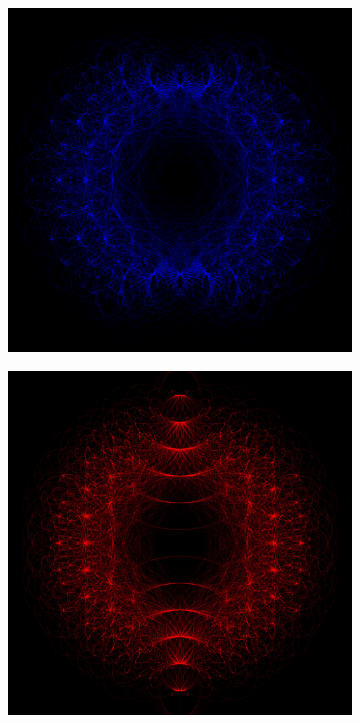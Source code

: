 \documentclass[a4paper,headsepline=3pt,headinclude=true,12pt,oneside]{scrartcl}
\begin{document}
\begin{onehalfspace}
	\begin{figure}[h]
		\begin{subfigure}{0.5\textwidth}
		    \includegraphics[width=\textwidth]{doc/deg8Impm30M.jpg}
		\end{subfigure}\hfill
        \begin{subfigure}{0.5\textwidth}
		    \includegraphics[width=\textwidth]{doc/deg8Repm30M.jpg}
		\end{subfigure}


\end{figure}
\end{onehalfspace}
\end{document}
